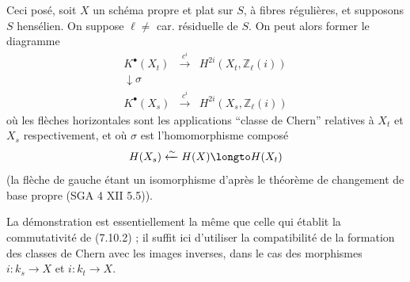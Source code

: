 Ceci pos\'e, soit $X$ un sch\'ema propre et plat sur $S$, \`a fibres r\'eguli\`eres, et supposons $S$ hens\'elien. On suppose $\ell \neq$ car. r\'esiduelle de $S$. On peut alors former le diagramme
\begin{equation}\label{eq:7.13.2}
\begin{array}{ccc}
K^{\bullet}(X_{t}) & \xrightarrow{\,c^{i}\,} & H^{2i}(X_{t}, \mathbb{Z}_{\ell}(i)) \\
\downarrow{\scriptstyle \sigma} & & \\
K^{\bullet}(X_{s}) & \xrightarrow{\,c^{i}\,} & H^{2i}(X_{s}, \mathbb{Z}_{\ell}(i))
\end{array}
\end{equation}
o\`u les fl\`eches horizontales sont les applications ``classe de Chern'' relatives \`a $X_{t}$ et $X_{s}$ respectivement, et o\`u $\sigma$ est l'homomorphisme compos\'e
\[
H(X_{s}) \xleftarrow{\sim} H(X) \longto H(X_{t})
\]
(la fl\`eche de gauche \'etant un isomorphisme d'apr\`es le th\'eor\`eme de changement de base propre (SGA 4 XII 5.5)).

La d\'emonstration est essentiellement la m\^eme que celle qui \'etablit la commutativit\'e de (7.10.2) ; il suffit ici d'utiliser la compatibilit\'e de la formation des classes de Chern avec les images inverses, dans le cas des morphismes $i : k_{s} \to X$ et $i : k_{t} \to X$.

